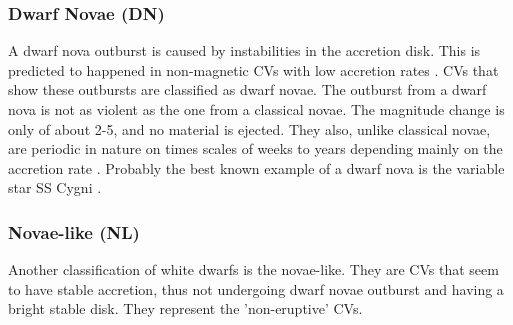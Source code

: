 
\subsubsection{Dwarf Novae (DN)}

A dwarf nova outburst is caused by instabilities in the accretion disk. This is predicted to happened in non-magnetic CVs with low accretion rates \citep{osaki_accretion_1974}. CVs that show these outbursts are classified as dwarf novae. The outburst from a dwarf nova is not as violent as the one from a classical novae. The magnitude change is only of about 2-5, and no material is ejected. They also, unlike classical novae, are periodic in nature on times scales of weeks to years depending mainly on the accretion rate \citep{shara_recent_1989}. Probably the best known example of a dwarf nova is the variable star SS Cygni \citep[e.g.][for a review]{cannizzo_study_1998}. 

\subsubsection{Novae-like (NL)}


Another classification of white dwarfs is the novae-like. They are CVs that seem to have stable accretion, thus not undergoing dwarf novae outburst and having a bright stable disk. They represent the 'non-eruptive' CVs.



